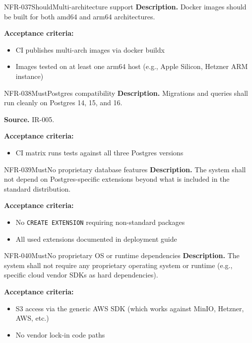\documentclass[11pt,a4paper]{article}
\begin{document}
\begin{requirement}{NFR-037}{Should}{Multi-architecture support}
\textbf{Description.} Docker images should be built for both amd64 and arm64 architectures.

\textbf{Acceptance criteria:}
\begin{itemize}
    \item CI publishes multi-arch images via docker buildx
    \item Images tested on at least one arm64 host (e.g., Apple Silicon, Hetzner ARM instance)
\end{itemize}
\end{requirement}

\begin{requirement}{NFR-038}{Must}{Postgres compatibility}
\textbf{Description.} Migrations and queries shall run cleanly on Postgres 14, 15, and 16.

\textbf{Source.} IR-005.

\textbf{Acceptance criteria:}
\begin{itemize}
    \item CI matrix runs tests against all three Postgres versions
\end{itemize}
\end{requirement}

\begin{requirement}{NFR-039}{Must}{No proprietary database features}
\textbf{Description.} The system shall not depend on Postgres-specific extensions beyond what is included in the standard distribution.

\textbf{Acceptance criteria:}
\begin{itemize}
    \item No \texttt{CREATE EXTENSION} requiring non-standard packages
    \item All used extensions documented in deployment guide
\end{itemize}
\end{requirement}

\begin{requirement}{NFR-040}{Must}{No proprietary OS or runtime dependencies}
\textbf{Description.} The system shall not require any proprietary operating system or runtime (e.g., specific cloud vendor SDKs as hard dependencies).

\textbf{Acceptance criteria:}
\begin{itemize}
    \item S3 access via the generic AWS SDK (which works against MinIO, Hetzner, AWS, etc.)
    \item No vendor lock-in code paths
\end{itemize}
\end{requirement}
\end{document}
